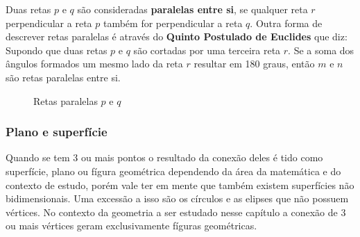 \begin{multicols*}{2}

    Duas retas $p$ e $q$ são consideradas \textbf{paralelas entre si}, se qualquer reta $r$ perpendicular a reta $p$ também for
    perpendicular a reta $q$. Outra forma de descrever retas paralelas é através do \textbf{Quinto Postulado de Euclides}
    que diz: Supondo que duas retas $p$ e $q$ são cortadas por uma terceira reta $r$. Se a soma dos ângulos formados um
    mesmo lado da reta $r$ resultar em 180 graus, então $m$ e $n$ são retas paralelas entre si.

    \begin{figure}[H]
        \centering
        \caption{Retas paralelas $p$ e $q$}
    \end{figure}



    \subsubsection*{Plano e superfície}
    Quando se tem 3 ou mais pontos o resultado da conexão deles é tido como superfície, plano ou fígura geométrica
    dependendo da área da matemática e do contexto de estudo, porém vale ter em mente que também existem superfícies
    não bidimensionais. Uma excessão a isso são os círculos e as elipses que não possuem vértices. No contexto da
    geometria a ser estudado nesse capítulo a conexão de 3 ou mais vértices geram exclusivamente fíguras geométricas.


\end{multicols*}
